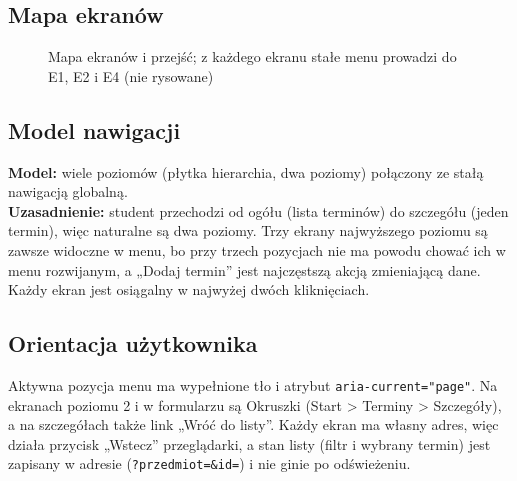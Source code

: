 \subsection{Mapa ekranów}
\begin{figure}[H]\centering
{}
\caption{Mapa ekranów i przejść; z każdego ekranu stałe menu prowadzi do E1, E2 i E4 (nie rysowane)}\label{rys:mapa}
\end{figure}

\subsection{Model nawigacji}
\textbf{Model:} wiele poziomów (płytka hierarchia, dwa poziomy) połączony ze stałą nawigacją globalną.\\
\textbf{Uzasadnienie:} student przechodzi od ogółu (lista terminów) do szczegółu (jeden termin), więc
naturalne są dwa poziomy. Trzy ekrany najwyższego poziomu są zawsze widoczne w menu, bo przy trzech
pozycjach nie ma powodu chować ich w menu rozwijanym, a „Dodaj termin” jest najczęstszą akcją zmieniającą
dane. Każdy ekran jest osiągalny w najwyżej dwóch kliknięciach.

\subsection{Orientacja użytkownika}
Aktywna pozycja menu ma wypełnione tło i atrybut \texttt{aria-current="page"}. Na ekranach poziomu 2
i w formularzu są Okruszki (Start \textgreater{} Terminy \textgreater{} Szczegóły), a na szczegółach także link
„Wróć do listy”. Każdy ekran ma własny adres, więc działa przycisk „Wstecz” przeglądarki, a stan listy
(filtr i wybrany termin) jest zapisany w adresie (\texttt{?przedmiot=\&id=}) i nie ginie po odświeżeniu.

